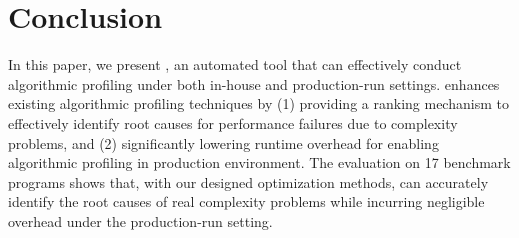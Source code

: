 \section{Conclusion}
\label{sec:con}

In this paper, we present \Tool, an automated tool that can effectively conduct algorithmic profiling
under both in-house and production-run settings.
\Tool enhances existing algorithmic profiling techniques by 
(1) providing a ranking mechanism to effectively identify root 
causes for performance failures due to complexity problems, 
and (2) significantly lowering runtime overhead 
for enabling algorithmic profiling in production environment. 
The evaluation on 17 benchmark programs shows that, with our designed optimization
methods, \Tool can accurately identify the root causes 
of real complexity problems
while incurring negligible overhead under the production-run setting. 

